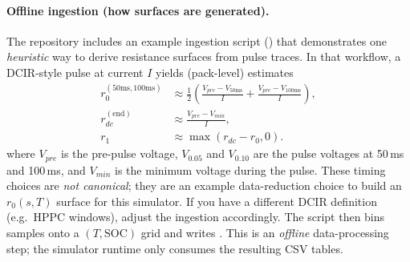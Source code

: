 \paragraph{Offline ingestion (how surfaces are generated).}
The repository includes an example ingestion script () that demonstrates one \emph{heuristic} way to derive resistance surfaces from pulse traces. In that workflow, a DCIR-style pulse at current \(I\) yields (pack-level) estimates
\begin{align}
  r_0^{(50\text{ms},100\text{ms})} &\approx \frac{1}{2}\left(\frac{V_{pre}-V_{50\text{ms}}}{I}+\frac{V_{pre}-V_{100\text{ms}}}{I}\right),\\
  r_{dc}^{(\text{end})} &\approx \frac{V_{pre}-V_{min}}{I},\\
  r_1 &\approx \max(r_{dc}-r_0, 0).
\end{align}
where \(V_{pre}\) is the pre-pulse voltage, \(V_{0.05}\) and \(V_{0.10}\) are the pulse voltages at 50\,ms and 100\,ms, and \(V_{min}\) is the minimum voltage during the pulse. These timing choices are \emph{not canonical}; they are an example data-reduction choice to build an \(r_0(s,T)\) surface for this simulator. If you have a different DCIR definition (e.g.\ HPPC windows), adjust the ingestion accordingly. The script then bins samples onto a \((T,\text{SOC})\) grid and writes . This is an \emph{offline} data-processing step; the simulator runtime only consumes the resulting CSV tables.
